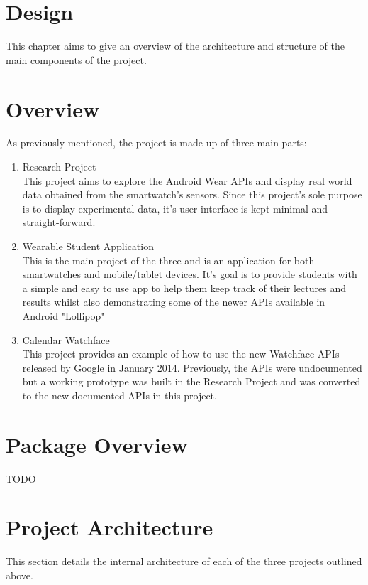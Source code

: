 \section{Design}

This chapter aims to give an overview of the architecture and structure of the
main components of the project.

\section{Overview}
As previously mentioned, the project is made up of three main parts:
\begin{enumerate}
\item Research Project\\
This project aims to explore the Android Wear APIs and display real world data
obtained from the smartwatch's sensors. Since this project's sole purpose is to
display experimental data, it's user interface is kept minimal and
straight-forward.
\item Wearable Student Application\\
This is the main project of the three and is an application for both
smartwatches and mobile/tablet devices. It's goal is to provide students with
a simple and easy to use app to help them keep track of their lectures and
results whilst also demonstrating some of the newer APIs available in Android
"Lollipop"
\item Calendar Watchface\\
This project provides an example of how to use the new Watchface APIs released
by Google in January 2014. Previously, the APIs were undocumented but a working
prototype was built in the Research Project and was converted to the new
documented APIs in this project.

\end{enumerate}

\section{Package Overview}
TODO

\section{Project Architecture}
This section details the internal architecture of each of the three projects
outlined above.

